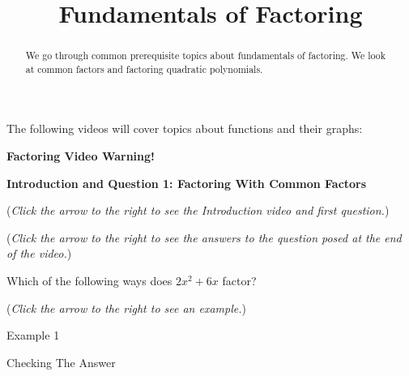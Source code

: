 \documentclass{ximera}
\title[Prerequisite Videos: ]{Fundamentals of Factoring}
\begin{document}
\begin{abstract}
  We go through common prerequisite topics about fundamentals of factoring. 
  We look at common factors and factoring quadratic polynomials.
\end{abstract}
\maketitle

The following videos will cover topics about functions and their graphs:


\textbf{Factoring Video Warning!}



\textbf{Introduction and Question 1: Factoring With Common Factors}
\begin{question}
\begin{flushright}
{\color{blue}(\emph{Click the arrow to the right to see the Introduction video and first question.})}
\end{flushright}
\begin{center}
\begin{expandable}
{\color{blue}(\emph{Click the arrow to the right to see the answers 
to the question posed at the end of the video.})}
\begin{expandable}
Which of the following ways does $2x^2 + 6x$ factor?
\begin{multipleChoice}
\end{multipleChoice}
\begin{flushright}
{\color{blue}(\emph{Click the arrow to the right to see an example.})}
\end{flushright}
\begin{expandable}
Example 1

Checking The Answer
\end{expandable}
\end{expandable}
\end{expandable}
\end{center}
\end{question}
\end{document}

